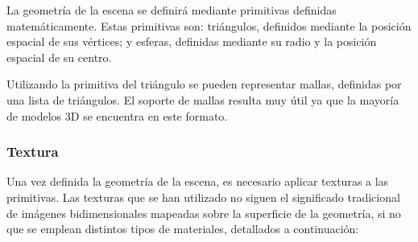 \documentclass[10pt, a4paper]{article}
\begin{document}
La geometría de la escena se definirá mediante primitivas definidas matemáticamente. Estas primitivas son: triángulos, definidos mediante la posición espacial de sus vértices; y esferas, definidas mediante su radio y la posición espacial de su centro. 

Utilizando la primitiva del triángulo se pueden representar mallas, definidas por una lista de triángulos. El soporte de mallas resulta muy útil ya que la mayoría de modelos 3D se encuentra en este formato. 

\subsubsection{Textura}

Una vez definida la geometría de la escena, es necesario aplicar texturas a las primitivas. Las texturas que se han utilizado no siguen el significado tradicional de imágenes bidimensionales mapeadas sobre la superficie de la geometría, si no que se emplean distintos tipos de materiales, detallados a continuación:
\end{document}
